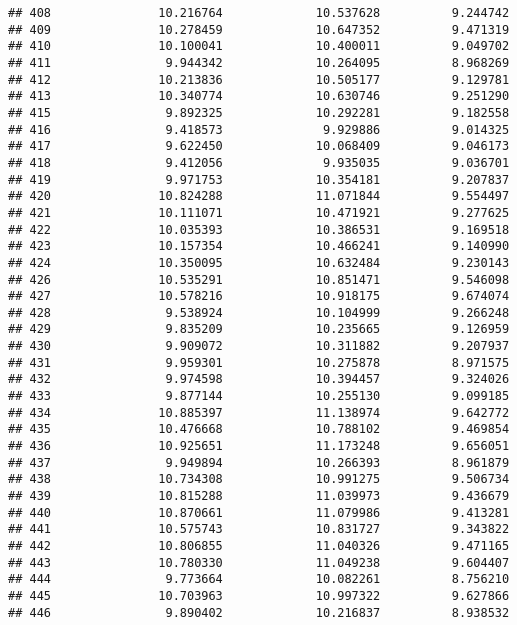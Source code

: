 \documentclass[
]{article}
\begin{document}
\begin{verbatim}
## 408               10.216764             10.537628          9.244742
## 409               10.278459             10.647352          9.471319
## 410               10.100041             10.400011          9.049702
## 411                9.944342             10.264095          8.968269
## 412               10.213836             10.505177          9.129781
## 413               10.340774             10.630746          9.251290
## 415                9.892325             10.292281          9.182558
## 416                9.418573              9.929886          9.014325
## 417                9.622450             10.068409          9.046173
## 418                9.412056              9.935035          9.036701
## 419                9.971753             10.354181          9.207837
## 420               10.824288             11.071844          9.554497
## 421               10.111071             10.471921          9.277625
## 422               10.035393             10.386531          9.169518
## 423               10.157354             10.466241          9.140990
## 424               10.350095             10.632484          9.230143
## 426               10.535291             10.851471          9.546098
## 427               10.578216             10.918175          9.674074
## 428                9.538924             10.104999          9.266248
## 429                9.835209             10.235665          9.126959
## 430                9.909072             10.311882          9.207937
## 431                9.959301             10.275878          8.971575
## 432                9.974598             10.394457          9.324026
## 433                9.877144             10.255130          9.099185
## 434               10.885397             11.138974          9.642772
## 435               10.476668             10.788102          9.469854
## 436               10.925651             11.173248          9.656051
## 437                9.949894             10.266393          8.961879
## 438               10.734308             10.991275          9.506734
## 439               10.815288             11.039973          9.436679
## 440               10.870661             11.079986          9.413281
## 441               10.575743             10.831727          9.343822
## 442               10.806855             11.040326          9.471165
## 443               10.780330             11.049238          9.604407
## 444                9.773664             10.082261          8.756210
## 445               10.703963             10.997322          9.627866
## 446                9.890402             10.216837          8.938532

\end{verbatim}
\end{document}
